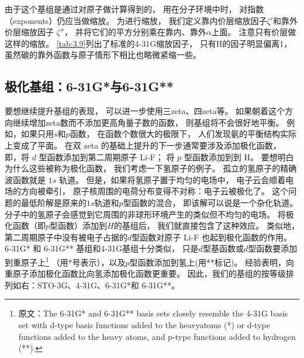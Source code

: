 由于这个基组是通过对原子做计算得到的，
用在分子环境中时，
对指数（exponents）仍应当做缩放。
为进行缩放，
我们定义靠内价层缩放因子$\zeta'$和靠外价层缩放因子 $\zeta''$，
并将它们的平方分别乘在靠内、靠外$\alpha$上面。 
注意只有价层做这样的缩放。
\autoref{tab:3.9}列出了标准的4-31G缩放因子，
只有H的因子明显偏离1，
虽然碳的靠外函数与原子情形下相比也略微紧缩一些。


\subsection{极化基组：6-31G*与6-31G**}
要想继续提升基组的表现，
可以进一步使用三zeta、四zeta等。
如果朝着这个方向继续增加zeta数而不添加更高角量子数的函数，
则基组将不会很好地平衡。
例如，如果只用$s$和$p$函数，
在函数个数很大的极限下，
人们发现氨的平衡结构实际上变成了平面。
在双 zeta 的基础上提升的下一步通常要涉及添加极化函数，
即，将 $d$ 型函数添加到第二周期原子 Li-F；
将 $p$ 型函数添加到到 H。
要想明白为什么这些被称为极化函数，
我们考虑一下氢原子的例子。
孤立的氢原子的精确波函数就是 $1s$ 轨道。
但是，如果将氢原子置于均匀的电场中，
电子云会顺着电场的方向被牵引，
原子核周围的电荷分布变得不对称：电子云被极化了。
这个问题的最低阶解是原来的$1s$轨道和$p$型函数的混合，
即该解可以说是一个杂化轨道。
分子中的氢原子会感觉到它周围的非球形环境产生的类似但不均匀的电场。
将极化函数（即$p$型函数）添加到$H$的基组后，
我们就直接包含了这种效应。
类似地，
第二周期原子中没有被电子占据的$d$型函数对原子 Li-F 也起到极化函数的作用。
6-31G* 和 6-31G** 基组和4-31G基组十分类似，
只是$d$型基函数或$d$型函数要添加到重原子上\footnote{
原文：The 6-31G* and 6-31G** basis sets closely resemble the 4-31G basis set 
with d-type basis functions added to the heavyatoms (*) 
or d-type functions added to the heavy atoms, 
and p-type functions added to hydrogen (**).}
（用*号表示），以及$p$型函数添加到氢上(用**标记)。
经验表明，向重原子添加极化函数比向氢添加极化函数更重要。
因此，我们的基组的按等级排列如右：STO-3G、4-31G、6-31G*和 6-31G**。

